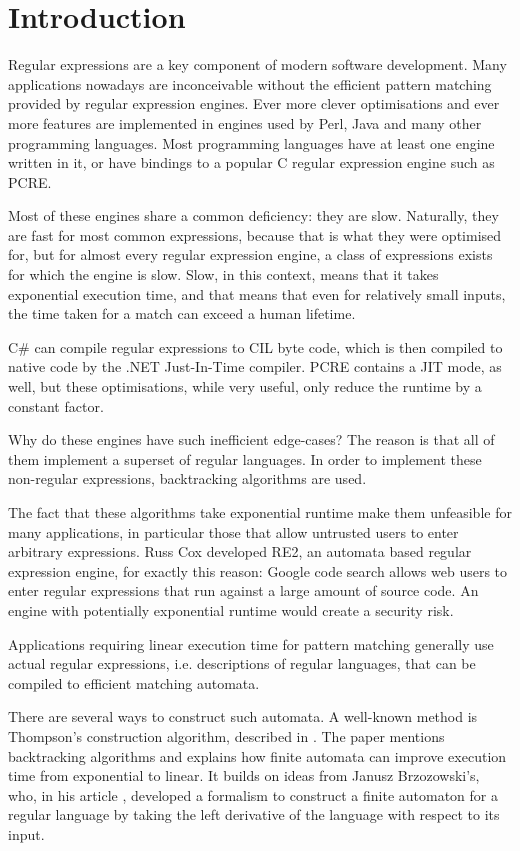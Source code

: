 \chapter{Introduction}

Regular expressions are a key component of modern software development. Many
applications nowadays are inconceivable without the efficient pattern matching
provided by regular expression engines. Ever more clever optimisations and ever
more features are implemented in engines used by Perl, Java and many other
programming languages. Most programming languages have at least one engine
written in it, or have bindings to a popular C regular expression engine such as
PCRE.

Most of these engines share a common deficiency: they are slow. Naturally, they
are fast for most common expressions, because that is what they were optimised
for, but for almost every regular expression engine, a class of expressions
exists for which the engine is slow. Slow, in this context, means that it takes
exponential execution time, and that means that even for relatively small
inputs, the time taken for a match can exceed a human lifetime.

C\# can compile regular expressions to CIL byte code, which is then compiled to
native code by the .NET Just-In-Time compiler. PCRE contains a JIT mode, as
well, but these optimisations, while very useful, only reduce the runtime by a
constant factor.

Why do these engines have such inefficient edge-cases? The reason is that all of
them implement a superset of regular languages. In order to implement these
non-regular expressions, backtracking algorithms are used.

The fact that these algorithms take exponential runtime make them unfeasible for
many applications, in particular those that allow untrusted users to enter
arbitrary expressions. Russ Cox developed RE2, an automata based regular
expression engine, for exactly this reason: Google code search allows web users
to enter regular expressions that run against a large amount of source code. An
engine with potentially exponential runtime would create a security risk.

Applications requiring linear execution time for pattern matching generally use
actual regular expressions, i.e. descriptions of regular languages, that can be
compiled to efficient matching automata.

There are several ways to construct such automata. A well-known method is
Thompson's construction algorithm, described in \cite{thompson}. The paper
mentions backtracking algorithms and explains how finite automata can improve
execution time from exponential to linear. It builds on ideas from Janusz
Brzozowski's, who, in his article \cite{brzozowski}, developed a formalism to
construct a finite automaton for a regular language by taking the left
derivative of the language with respect to its input.


